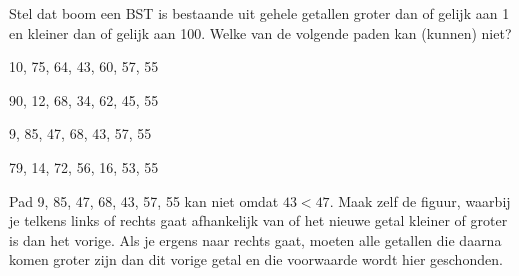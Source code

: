 \begin{oef}
\papier Stel dat boom een BST is bestaande uit gehele getallen groter dan of gelijk aan 1 en kleiner dan of gelijk aan 100. Welke van de volgende paden kan (kunnen) niet?
\begin{oefenumerate}
\item 10, 75, 64, 43, 60, 57, 55
\item 90, 12, 68, 34, 62, 45, 55
\item 9, 85, 47, 68, 43, 57, 55
\item 79, 14, 72, 56, 16, 53, 55
\end{oefenumerate}
\begin{opl}
Pad 9, 85, 47, 68, 43, 57, 55 kan niet omdat $43 < 47$. Maak zelf de figuur, waarbij je telkens links of rechts gaat afhankelijk van of het nieuwe getal kleiner of groter is dan het vorige. Als je ergens naar rechts gaat, moeten alle getallen die daarna komen groter zijn dan dit vorige getal en die voorwaarde wordt hier geschonden.
\end{opl}
\end{oef}




